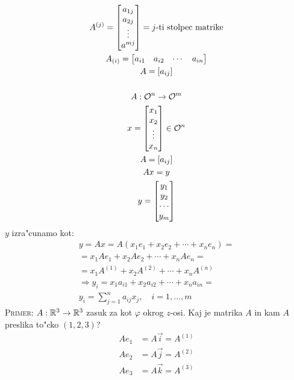 \begin{gather*}
A^{(j)} = \begin{bmatrix}
a_{1j} \\ a_{2j} \\ \vdots \\ a^{mj}
\end{bmatrix} = \text{$j$-ti stolpec matrike} \\
A_{(i)} = \begin{bmatrix}
a_{i1} & a_{i2} & \cdots & a_{in}
\end{bmatrix} \\
A = [a_{ij}]\\\\
A : \mathcal{O}^n \to \mathcal{O}^m \\
x = \begin{bmatrix}
x_1 \\ x_2 \\ \vdots \\ x_n
\end{bmatrix} \in \mathcal{O}^n \\
A = [a_{ij}] \\
Ax = y \\
y = \begin{bmatrix}
y_1 \\ y_2 \\ \cdots \\ y_m
\end{bmatrix}
\end{gather*} 
$y$ izra"cunamo kot:
\begin{multline*}
y = Ax = A(x_1 e_1 + x_2 e_2 + \cdots + x_n e_n) = \\
= x_1 A e_1 + x_2 A e_2 + \cdots + x_n A e_n = \\
= x_1 A^{(1)} + x_2 A^{(2)} + \cdots + x_n A^{(n)} \\
\Rightarrow y_i = x_1 a_{i1} + x_2 a_{i2} + \cdots + x_n a_{in} = \\
y_i = \sum_{j=1}^{n} a_{ij} x_j, \quad i = 1, \ldots, m
\end{multline*}
\textsc{Primer:} $A: \mathbb{R}^3 \to \mathbb{R}^3$ zasuk za kot $\varphi$ okrog $z$-osi. Kaj je matrika $A$ in kam $A$ preslika to"cko $(1, 2, 3)$?
\begin{align*}
A e_1 &= A\vec{i} = A^{(1)} \\
A e_2 &= A\vec{j} = A^{(2)} \\
A e_3 &= A\vec{k} = A^{(3)}
\end{align*}
